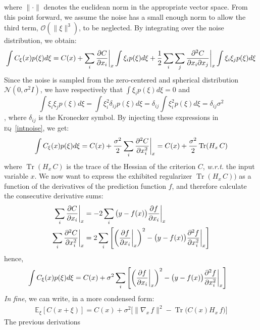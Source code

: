 where $\lVert \cdot \rVert$ denotes the euclidean norm in the appropriate vector space.
From this point forward, we assume the noise has a small enough norm to allow the
third term, $\mathcal{O}(\lVert \xi \rVert ^3)$, to be neglected.
By integrating over the noise distribution, we obtain:
\begin{align}
\int C_\xi (x) p(\xi)d\xi = C(x)
+ \sum_i \pdv{C}{x_i} \bigg\rvert_{x} \int \xi_i p(\xi)d\xi
+ \frac{1}{2} \sum_i\sum_j \pdv{C}{x_i}{x_j} \bigg\rvert_{x} \int \xi_i \xi_j p(\xi)d\xi
\label{intnoise}
\end{align}
Since the noise is sampled from
the zero-centered and spherical distribution $\mathcal{N}(0, \sigma^2I)$,
we have respectively that
$\int \xi_i p(\xi)d\xi = 0$ and
\[\int \xi_i \xi_j p(\xi)d\xi
= \int \xi_i^2 \delta_{ij} p(\xi)d\xi
= \delta_{ij} \int \xi_i^2  p(\xi)d\xi
= \delta_{ij} \sigma^2\],
where $\delta_{ij}$ is the Kronecker symbol.
By injecting these expressions in \textsc{eq}~\ref{intnoise}, we get:
\begin{align}
\int C_\xi (x) p(\xi)d\xi
= C(x)
+ \frac{\sigma^2}{2} \sum_i \pdv[2]{C}{x_i} \bigg\rvert_{x}
= C(x)
+ \frac{\sigma^2}{2} \operatorname{Tr}(H_x \, C)
\end{align}
where $\operatorname{Tr}(H_x \, C)$ is the trace of the Hessian of the criterion $C$,
\textit{w.r.t.} the input variable $x$.
We now want to express the exhibited regularizer $\operatorname{Tr}(H_x \, C))$
as a function of the derivatives of the prediction function $f$,
and therefore calculate the consecutive derivative sums:
\begin{align}
\sum_i \pdv{C}{x_i} \bigg\rvert_{x}
&= -2 \sum_i \big ( y - f(x) \big ) \pdv{f}{x_i} \bigg\rvert_{x} \\
\sum_i \pdv[2]{C}{x_i} \bigg\rvert_{x}
&= 2 \sum_i \Bigg [ \bigg ( \pdv{f}{x_i} \bigg\rvert_{x} \bigg ) ^2
- \big ( y - f(x) \big ) \pdv[2]{f}{x_i} \bigg\rvert_{x} \Bigg ]
\end{align}
hence,
\begin{align}
\int C_\xi (x) p(\xi)d\xi
&= C(x)
+ \sigma^2
\sum_i \Bigg [ \bigg ( \pdv{f}{x_i} \bigg\rvert_{x} \bigg ) ^2
- \big ( y - f(x) \big ) \pdv[2]{f}{x_i} \bigg\rvert_{x} \Bigg ]
\end{align}
\textit{In fine}, we can write, in a more condensed form:
\begin{align}
\mathbb{E}_\xi [C(x + \xi)]
= C(x) + \sigma^2 \Big [ \lVert \nabla_x \, f \rVert^2
- \operatorname{Tr}\big(C(x) H_x \, f \big) \Big ]
\end{align}
The previous derivations
